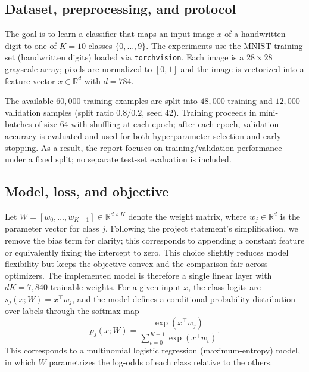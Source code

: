 \documentclass[11pt]{article}
\numberwithin{equation}{section}
\numberwithin{table}{section}
\numberwithin{figure}{section}
\numberwithin{algorithm}{section}
\begin{document}
\subsection{Dataset, preprocessing, and protocol}
The goal is to learn a classifier that maps an input image \(x\) of a handwritten digit to one of \(K=10\) classes \(\{0,\dots,9\}\). The experiments use the MNIST training set (handwritten digits) loaded via \texttt{torchvision}. Each image is a \(28\times 28\) grayscale array; pixels are normalized to \([0,1]\) and the image is vectorized into a feature vector \(x\in\mathbb{R}^{d}\) with \(d=784\).

The available \(60{,}000\) training examples are split into \(48{,}000\) training and \(12{,}000\) validation samples (split ratio \(0.8/0.2\), seed 42). Training proceeds in mini-batches of size 64 with shuffling at each epoch; after each epoch, validation accuracy is evaluated and used for both hyperparameter selection and early stopping. As a result, the report focuses on training/validation performance under a fixed split; no separate test-set evaluation is included.

\subsection{Model, loss, and objective}
Let \(W=[w_0,\dots,w_{K-1}]\in\mathbb{R}^{d\times K}\) denote the weight matrix, where \(w_j\in\mathbb{R}^{d}\) is the parameter vector for class \(j\). Following the project statement's simplification, we remove the bias term for clarity; this corresponds to appending a constant feature or equivalently fixing the intercept to zero. This choice slightly reduces model flexibility but keeps the objective convex and the comparison fair across optimizers. The implemented model is therefore a single linear layer with \(dK=7{,}840\) trainable weights. For a given input \(x\), the class logits are \(s_j(x;W)=x^\top w_j\), and the model defines a conditional probability distribution over labels through the softmax map
\begin{equation}
p_j(x;W)=\frac{\exp(x^\top w_j)}{\sum_{t=0}^{K-1}\exp(x^\top w_t)}.
\label{eq:softmax}
\end{equation}
This corresponds to a multinomial logistic regression (maximum-entropy) model, in which \(W\) parametrizes the log-odds of each class relative to the others.
\end{document}
